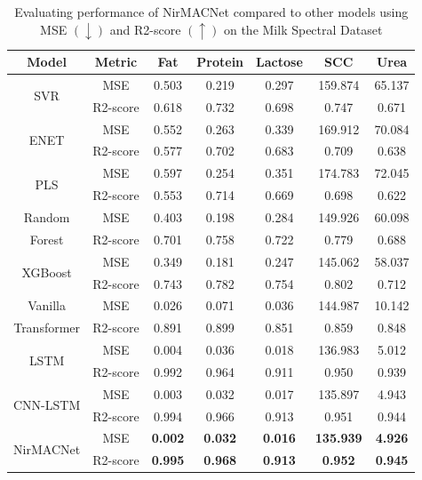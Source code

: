 \documentclass[10pt, a4paper, oneside]{article}
\begin{document}
\begin{table}[!h]
\centering
\begin{tabular}{ccc@{\hspace{10pt}}c@{\hspace{10pt}}c@{\hspace{10pt}}c@{\hspace{10pt}}c}
\hline
\textbf{Model} & \textbf{Metric} & \textbf{Fat} & \textbf{Protein} & \textbf{Lactose} & \textbf{SCC} & \textbf{Urea} \\
\hline
\multirow{2}{*}{SVR} & MSE     & 0.503 & 0.219 & 0.297 & 159.874 & 65.137 \\
& R2-score      & 0.618 & 0.732 & 0.698 & 0.747   & 0.671 \\
\multirow{2}{*}{ENET} & MSE    & 0.552 & 0.263 & 0.339 & 169.912 & 70.084 \\
& R2-score     & 0.577 & 0.702 & 0.683 & 0.709   & 0.638 \\
\multirow{2}{*}{PLS} & MSE     & 0.597 & 0.254 & 0.351 & 174.783 & 72.045 \\
& R2-score      & 0.553 & 0.714 & 0.669 & 0.698   & 0.622 \\
Random & MSE & 0.403 & 0.198 & 0.284 & 149.926 & 60.098 \\
Forest & R2-score  & 0.701 & 0.758 & 0.722 & 0.779   & 0.688 \\
\multirow{2}{*}{XGBoost} & MSE & 0.349 & 0.181 & 0.247 & 145.062 & 58.037 \\
& R2-score  & 0.743 & 0.782 & 0.754 & 0.802   & 0.712 \\
Vanilla & MSE & 0.026 & 0.071 & 0.036 & 144.987 & 10.142 \\
Transformer & R2-score  & 0.891 & 0.899 & 0.851 & 0.859   & 0.848 \\
\multirow{2}{*}{LSTM} & MSE         & 0.004 & 0.036 & 0.018 & 136.983 & 5.012 \\
& R2-score & 0.992 & 0.964 & 0.911 & 0.950   & 0.939 \\
\multirow{2}{*}{CNN-LSTM} & MSE     & 0.003 & 0.032 & 0.017 & 135.897 & 4.943 \\
& R2-score & 0.994 & 0.966 & 0.913 & 0.951   & 0.944 \\
\multirow{2}{*}{NirMACNet} & MSE & \textbf{0.002} & \textbf{0.032} & \textbf{0.016} & \textbf{135.939} & \textbf{4.926} \\ 
& R2-score & \textbf{0.995} & \textbf{0.968} & \textbf{0.913} & \textbf{0.952} & \textbf{0.945} \\
\hline
\end{tabular}
\caption{Evaluating performance of NirMACNet compared to other models using MSE $(\downarrow)$ and R2-score $(\uparrow)$ on the Milk Spectral Dataset}\label{tab:table5}
\end{table}
\end{document}
